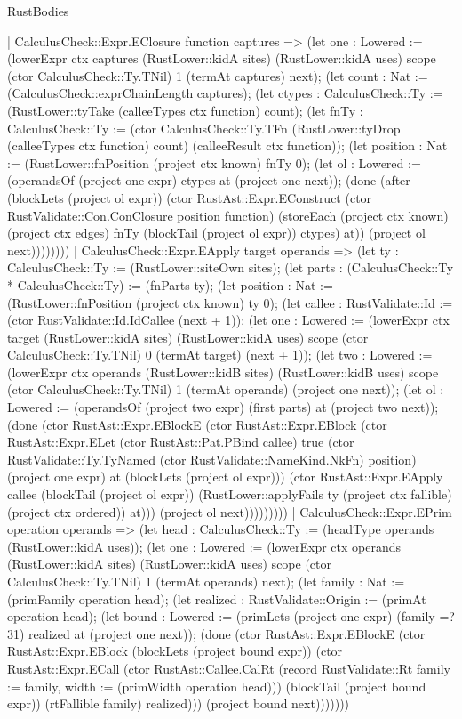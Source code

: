 \begin{lexlean}{RustBodies}
\begin{semanticmodule}
{    | CalculusCheck::Expr.EClosure function captures => (let one : Lowered := (lowerExpr ctx captures (RustLower::kidA sites) (RustLower::kidA uses) scope (ctor CalculusCheck::Ty.TNil) 1 (termAt captures) next); (let count : Nat := (CalculusCheck::exprChainLength captures); (let ctypes : CalculusCheck::Ty := (RustLower::tyTake (calleeTypes ctx function) count); (let fnTy : CalculusCheck::Ty := (ctor CalculusCheck::Ty.TFn (RustLower::tyDrop (calleeTypes ctx function) count) (calleeResult ctx function)); (let position : Nat := (RustLower::fnPosition (project ctx known) fnTy 0); (let ol : Lowered := (operandsOf (project one expr) ctypes at (project one next)); (done (after (blockLets (project ol expr)) (ctor RustAst::Expr.EConstruct (ctor RustValidate::Con.ConClosure position function) (storeEach (project ctx known) (project ctx edges) fnTy (blockTail (project ol expr)) ctypes) at)) (project ol next))))))))
    | CalculusCheck::Expr.EApply target operands => (let ty : CalculusCheck::Ty := (RustLower::siteOwn sites); (let parts : (CalculusCheck::Ty * CalculusCheck::Ty) := (fnParts ty); (let position : Nat := (RustLower::fnPosition (project ctx known) ty 0); (let callee : RustValidate::Id := (ctor RustValidate::Id.IdCallee (next + 1)); (let one : Lowered := (lowerExpr ctx target (RustLower::kidA sites) (RustLower::kidA uses) scope (ctor CalculusCheck::Ty.TNil) 0 (termAt target) (next + 1)); (let two : Lowered := (lowerExpr ctx operands (RustLower::kidB sites) (RustLower::kidB uses) scope (ctor CalculusCheck::Ty.TNil) 1 (termAt operands) (project one next)); (let ol : Lowered := (operandsOf (project two expr) (first parts) at (project two next)); (done (ctor RustAst::Expr.EBlockE (ctor RustAst::Expr.EBlock (ctor RustAst::Expr.ELet (ctor RustAst::Pat.PBind callee) true (ctor RustValidate::Ty.TyNamed (ctor RustValidate::NameKind.NkFn) position) (project one expr) at (blockLets (project ol expr))) (ctor RustAst::Expr.EApply callee (blockTail (project ol expr)) (RustLower::applyFails ty (project ctx fallible) (project ctx ordered)) at))) (project ol next)))))))))
    | CalculusCheck::Expr.EPrim operation operands => (let head : CalculusCheck::Ty := (headType operands (RustLower::kidA uses)); (let one : Lowered := (lowerExpr ctx operands (RustLower::kidA sites) (RustLower::kidA uses) scope (ctor CalculusCheck::Ty.TNil) 1 (termAt operands) next); (let family : Nat := (primFamily operation head); (let realized : RustValidate::Origin := (primAt operation head); (let bound : Lowered := (primLets (project one expr) (family =? 31) realized at (project one next)); (done (ctor RustAst::Expr.EBlockE (ctor RustAst::Expr.EBlock (blockLets (project bound expr)) (ctor RustAst::Expr.ECall (ctor RustAst::Callee.CalRt (record RustValidate::Rt {family := family, width := (primWidth operation head)})) (blockTail (project bound expr)) (rtFallible family) realized))) (project bound next)))))))
}
\end{semanticmodule}
\end{lexlean}
